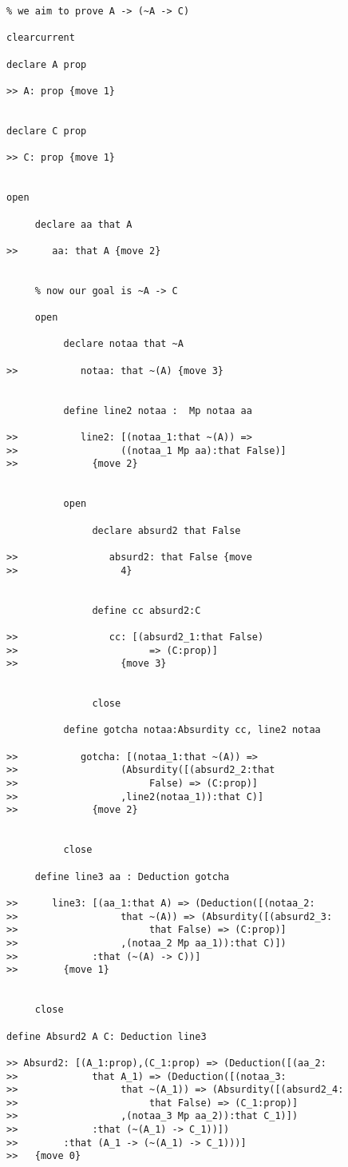 \documentclass[12pt]{article}
\begin{document}
\begin{verbatim}
% we aim to prove A -> (~A -> C)

clearcurrent

declare A prop

>> A: prop {move 1}


declare C prop

>> C: prop {move 1}


open

     declare aa that A

>>      aa: that A {move 2}


     % now our goal is ~A -> C

     open

          declare notaa that ~A

>>           notaa: that ~(A) {move 3}


          define line2 notaa :  Mp notaa aa

>>           line2: [(notaa_1:that ~(A)) => 
>>                  ((notaa_1 Mp aa):that False)]
>>             {move 2}


          open

               declare absurd2 that False

>>                absurd2: that False {move 
>>                  4}


               define cc absurd2:C

>>                cc: [(absurd2_1:that False) 
>>                       => (C:prop)]
>>                  {move 3}


               close

          define gotcha notaa:Absurdity cc, line2 notaa

>>           gotcha: [(notaa_1:that ~(A)) => 
>>                  (Absurdity([(absurd2_2:that 
>>                       False) => (C:prop)]
>>                  ,line2(notaa_1)):that C)]
>>             {move 2}


          close

     define line3 aa : Deduction gotcha

>>      line3: [(aa_1:that A) => (Deduction([(notaa_2:
>>                  that ~(A)) => (Absurdity([(absurd2_3:
>>                       that False) => (C:prop)]
>>                  ,(notaa_2 Mp aa_1)):that C)])
>>             :that (~(A) -> C))]
>>        {move 1}


     close

define Absurd2 A C: Deduction line3

>> Absurd2: [(A_1:prop),(C_1:prop) => (Deduction([(aa_2:
>>             that A_1) => (Deduction([(notaa_3:
>>                  that ~(A_1)) => (Absurdity([(absurd2_4:
>>                       that False) => (C_1:prop)]
>>                  ,(notaa_3 Mp aa_2)):that C_1)])
>>             :that (~(A_1) -> C_1))])
>>        :that (A_1 -> (~(A_1) -> C_1)))]
>>   {move 0}



\end{verbatim}
\end{document}
